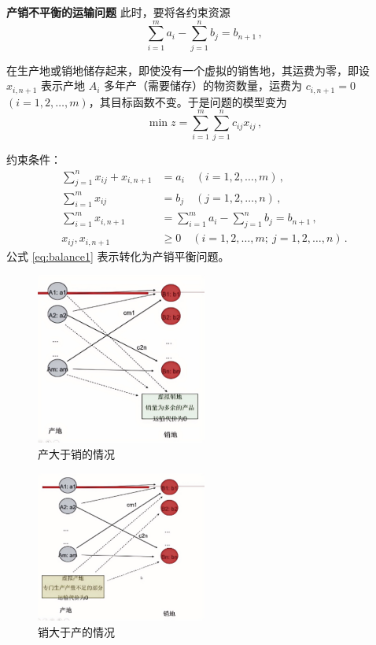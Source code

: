 \begin{exbox}{\textbf{产销不平衡的运输问题}}
    此时，要将各约束资源
    \begin{equation}
        \sum_{i=1}^{m} a_i - \sum_{j=1}^{n} b_j = b_{n+1} \,,
    \end{equation}
    
    在生产地或销地储存起来，即使没有一个虚拟的销售地，其运费为零，即设 $x_{i,n+1}$ 表示产地 $A_i$ 多年产（需要储存）的物资数量，运费为 $c_{i,n+1}=0$ $(i=1,2,\dots,m)$，其目标函数不变。于是问题的模型变为
    \begin{equation}
        \min z = \sum_{i=1}^{m} \sum_{j=1}^{n} c_{ij} x_{ij} \,,
    \end{equation}
    
    约束条件：
    \begin{align}
        \sum_{j=1}^{n} x_{ij} + x_{i,n+1} &= a_i \quad (i=1,2,\dots,m) \,, \label{eq:balance1} \\
        \sum_{i=1}^{m} x_{ij} &= b_j \quad (j=1,2,\dots,n) \,, \label{eq:balance2} \\
        \sum_{i=1}^{m} x_{i,n+1} &= \sum_{i=1}^{m} a_i - \sum_{j=1}^{n} b_j = b_{n+1} \,, \label{eq:balance3} \\
        x_{ij}, x_{i,n+1} &\geq 0 \quad (i=1,2,\dots,m;\ j=1,2,\dots,n) \,. \label{eq:Chapter3_nonneg_1}
    \end{align}
    公式 \eqref{eq:balance1} 表示转化为产销平衡问题。
\end{exbox}
\begin{figure}[H]
    \centering
    \includegraphics[width=0.5\textwidth]{6.png}
    \caption{产大于销的情况}
    \label{fig:Chapter3_Temporary_Pavilion_2}
\end{figure}

\begin{figure}[H]
    \centering
    \includegraphics[width=0.5\textwidth]{7.png}
    \caption{销大于产的情况}
    \label{fig:Chapter3_Temporary_Pavilion_3}
\end{figure}

